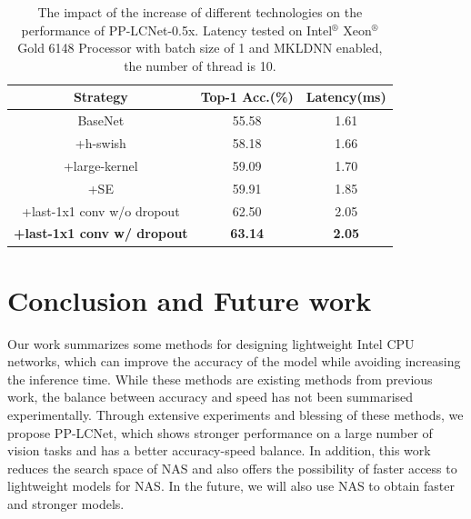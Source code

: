 \documentclass[final]{cvpr}
\begin{document}
\begin{table}[!htb]
\begin{center}

\begin{tabular}{c|c|c}
\toprule
 Strategy &  Top-1 Acc.(\%)  & Latency(ms)\\
\midrule[1pt]
BaseNet    & 55.58   & 1.61\\
+h-swish    & 58.18   & 1.66\\
+large-kernel    & 	59.09   & 1.70\\
+SE    & 59.91   & 1.85\\
+last-1x1 conv w/o dropout  & 62.50   & 2.05\\
\textbf{+last-1x1 conv w/ dropout}    & 	\textbf{63.14}   & \textbf{2.05}\\

\bottomrule
\end{tabular}
\end{center}

\caption{The impact of the increase of different technologies on the performance of PP-LCNet-0.5x. Latency tested on Intel$^\circledR$ Xeon$^\circledR$ Gold 6148 Processor with batch size of 1 and  MKLDNN enabled, the number of thread is 10.}
\label{tab:increase-technologies}
\end{table}





\section{Conclusion and Future work}
Our work summarizes some methods for designing lightweight Intel CPU networks, which can improve the accuracy of the model while avoiding increasing the inference time. While these methods are existing methods from previous work, the balance between accuracy and speed has not been summarised experimentally. Through extensive experiments and blessing of these methods, we propose PP-LCNet, which shows stronger performance on a large number of vision tasks and has a better accuracy-speed balance. In addition, this work reduces the search space of NAS and also offers the possibility of faster access to lightweight models for NAS. In the future, we will also use NAS to obtain faster and stronger models.






{\small
% 


}
\end{document}
